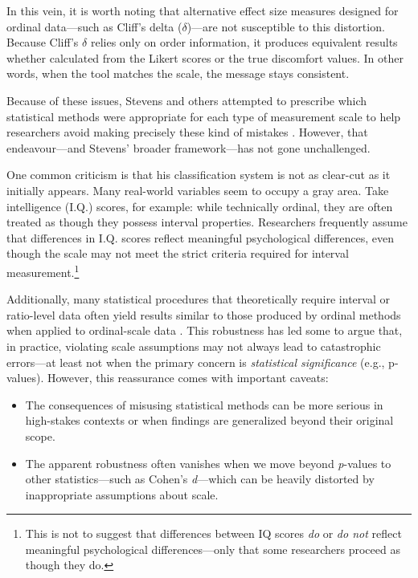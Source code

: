 In this vein, it is worth noting that alternative effect size measures designed for ordinal data—such as Cliff’s delta ($\delta$)—are not susceptible to this distortion. Because Cliff’s $\delta$ relies only on order information, it produces equivalent results whether calculated from the Likert scores or the true discomfort values. In other words, when the tool matches the scale, the message stays consistent.

Because of these issues, Stevens and others attempted to prescribe which statistical methods were appropriate for each type of measurement scale to help researchers avoid making precisely these kind of mistakes \parencite{Robinson1965, Senders1958, Stevens1946}. However, that endeavour—and Stevens’ broader framework—has not gone unchallenged.

One common criticism is that his classification system is not as clear-cut as it initially appears. Many real-world variables seem to occupy a gray area. Take intelligence (I.Q.) scores, for example: while technically ordinal, they are often treated as though they possess interval properties. Researchers frequently assume that differences in I.Q. scores reflect meaningful psychological differences, even though the scale may not meet the strict criteria required for interval measurement.\footnote{This is not to suggest that differences between IQ scores \textit{do} or \textit{do not} reflect meaningful psychological differences—only that some researchers proceed as though they do.} 

Additionally, many statistical procedures that theoretically require interval or ratio-level data often yield results similar to those produced by ordinal methods when applied to ordinal-scale data \parencite{Baker1966}. This robustness has led some to argue that, in practice, violating scale assumptions may not always lead to catastrophic errors—at least not when the primary concern is \textit{statistical significance} (e.g., p-values). However, this reassurance comes with important caveats:

\begin{itemize}
    \item The consequences of misusing statistical methods can be more serious in high-stakes contexts or when findings are generalized beyond their original scope.
    \item The apparent robustness often vanishes when we move beyond \textit{p}-values to other statistics—such as Cohen’s \textit{d}—which can be heavily distorted by inappropriate assumptions about scale.
\end{itemize}

